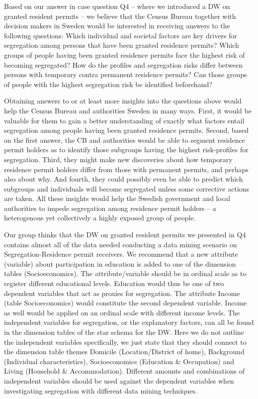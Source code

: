 Based on our answer in case question Q4 – where we introduced a DW on granted resident permits – 
we believe that the Census Bureau together with decision makers in Sweden would be interested in 
receiving answers to the following questions: 
Which individual and societal factors are key drivers for segregation among persons that have been granted residence permits? 
Which groups of people having been granted residence permits face the highest risk of becoming segregated? 
How do the profiles and segregation risks differ between persons with temporary contra permanent residence permits? 
Can those groups of people with the highest segregation risk be identified beforehand? 

Obtaining answers to or at least more insights into the questions above would help the Census Bureau and authorities Sweden in many ways.
First, it would be valuable for them to gain a better understanding of exactly what factors entail segregation among people 
having been granted residence permits. 
Second, based on the first answer, 
the CB and authorities would be able to segment residence permit holders as to identify those subgroups having 
the highest risk-profiles for segregation. 
Third, they might make new discoveries about how temporary residence permit holders differ from those with permanent permits, 
and perhaps also about why. And fourth, they could possibly even be able to predict which subgroups and individuals will 
become segregated unless some corrective actions are taken. 
All these insights would help the Swedish government and local authorities to impede segregation among residence permit holders – 
a heterogenous yet collectively a highly exposed group of people.  

Our group thinks that the DW on granted resident permits we presented in Q4 contains almost all of the data needed conducting a data mining
scenario on Segregation-Residence permit receivers. 
We recommend that a new attribute (variable) about participation in education is added to one of the dimension tables (Socioeconomics). 
The attribute/variable should be in ordinal scale as to register different educational levels. 
Education would thus be one of two dependent variables that act as proxies for segregation. 
The attribute Income (table Socioeconomics) would constitute the second dependent variable. 
Income as well would be applied on an ordinal scale with different income levels. 
The independent variables for segregation, or the explanatory factors, 
can all be found in the dimension tables of the star schema for the DW. 
Here we do not outline the independent variables specifically, 
we just state that they should connect to the dimension table themes Domicile (Location/District of home), 
Background (Individual characteristics), Socioeconomics (Education \& Occupation) and Living (Household \& Accommodation).
Different amounts and combinations of independent variables should be used against the dependent variables when 
investigating segregation with different data mining techniques.  

